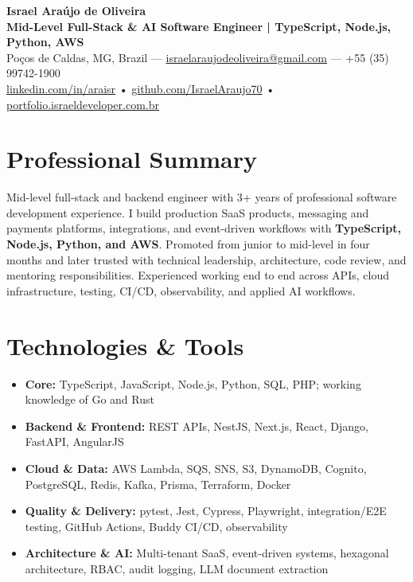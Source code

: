 \documentclass[a4paper,10pt]{article}
\begin{document}
\raggedright

\begin{center}
    {\LARGE \textbf{Israel Araújo de Oliveira}}\\[3pt]
    \textbf{Mid-Level Full-Stack \& AI Software Engineer | TypeScript, Node.js, Python, AWS}\\[3pt]
    Poços de Caldas, MG, Brazil —
    \href{mailto:israelaraujodeoliveira@gmail.com}{israelaraujodeoliveira@gmail.com} —
    +55 (35) 99742-1900\\
    \href{https://www.linkedin.com/in/araisr/}{linkedin.com/in/araisr} •
    \href{https://github.com/IsraelAraujo70}{github.com/IsraelAraujo70} •
    \href{https://portfolio.israeldeveloper.com.br/}{portfolio.israeldeveloper.com.br}
\end{center}

\section*{Professional Summary}
Mid-level full-stack and backend engineer with 3+ years of professional software development experience. I build production SaaS products, messaging and payments platforms, integrations, and event-driven workflows with \textbf{TypeScript, Node.js, Python, and AWS}. Promoted from junior to mid-level in four months and later trusted with technical leadership, architecture, code review, and mentoring responsibilities. Experienced working end to end across APIs, cloud infrastructure, testing, CI/CD, observability, and applied AI workflows.

\section*{Technologies \& Tools}
\begin{itemize}[leftmargin=*, itemsep=2pt]
    \item \textbf{Core:} TypeScript, JavaScript, Node.js, Python, SQL, PHP; working knowledge of Go and Rust
    \item \textbf{Backend \& Frontend:} REST APIs, NestJS, Next.js, React, Django, FastAPI, AngularJS
    \item \textbf{Cloud \& Data:} AWS Lambda, SQS, SNS, S3, DynamoDB, Cognito, PostgreSQL, Redis, Kafka, Prisma, Terraform, Docker
    \item \textbf{Quality \& Delivery:} pytest, Jest, Cypress, Playwright, integration/E2E testing, GitHub Actions, Buddy CI/CD, observability
    \item \textbf{Architecture \& AI:} Multi-tenant SaaS, event-driven systems, hexagonal architecture, RBAC, audit logging, LLM document extraction
\end{itemize}
\end{document}
